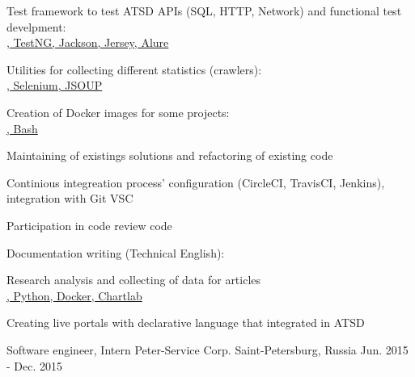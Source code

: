 \begin{cventries}
{\begin{cvitems}
{    \href{https://github.com/axibase/jmeter-time-window-backend-listener}{\faGithubSquare\acvHeaderIconSep\@JMeter}
    \href{https://github.com/getredash/redash/pull/1622}{\faGithubSquare\acvHeaderIconSep\@Redash}
    }
    \item { Test framework to test ATSD APIs (SQL, HTTP, Network) and functional test develpment:
    \\ \href{https://github.com/axibase/atsd-api-test}{\faGithubSquare\acvHeaderIconSep\@Java, TestNG, Jackson, Jersey, Alure}
    }
    \item { Utilities for collecting different statistics (crawlers):
    \\ \href{https://github.com/axibase/atsd-data-crawlers/tree/energinet-grabber}{\faGithubSquare\acvHeaderIconSep\@Java, Selenium, JSOUP}
    }
    \item { Creation of Docker images for some projects:
    \\ \href{https://github.com/axibase/atsd-data-crawlers/tree/energinet-grabber-docker}{\faGithubSquare\acvHeaderIconSep\@Docker, Bash}
    }
    \item{Maintaining of existings solutions and refactoring of existing code}
    \item{Continious integreation process' configuration (CircleCI, TravisCI, Jenkins), integration with Git VSC}
    \item{Participation in code review code}
    \item{Documentation writing (Technical English):
    \\ \href{https://github.com/axibase/atsd}{\faGithubSquare\acvHeaderIconSep\@Markdown}
    }
    \item{Research analysis and collecting of data for articles
    \\ \href{https://github.com/axibase/atsd-use-cases}{\faGithubSquare\acvHeaderIconSep\@Bash, Python, Docker, Chartlab}
    }
    \item{Creating live portals with declarative language that integrated in ATSD}
  \end{cvitems}
  }
  \cventry
  {Software engineer, Intern} %
  {Peter-Service Corp.} %
  {Saint-Petersburg, Russia} %
  {Jun. 2015 - Dec. 2015} %
  {
  \begin{cvitems} %

\end{cvitems}}
\end{cventries}
